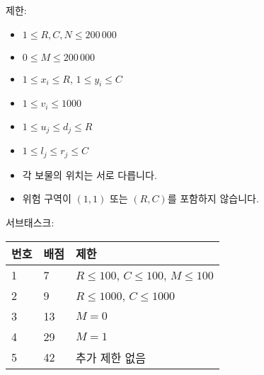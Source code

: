 제한:

\begin{itemize}
\item $1 \le R,C,N \le 200\,000$
\item $0 \le M \le 200\,000$
\item $1 \le x_i \le R$, $1 \le y_i \le C$
\item $1 \le v_i \le 1000$
\item $1 \le u_j \le d_j \le R$
\item $1 \le l_j \le r_j \le C$
\item 각 보물의 위치는 서로 다릅니다.
\item 위험 구역이 $(1, 1)$ 또는 $(R, C)$를 포함하지 않습니다.
\end{itemize}

서브태스크:

\begin{tabular}{|l|l|l|} \hline
  \textbf{번호} & \textbf{배점} & \textbf{제한} \\ \hline
  1 & 7 & $R \le 100$, $C \le 100$, $M \le 100$ \\ \hline
  2 & 9 & $R \le 1000$, $C \le 1000$ \\ \hline
  3 & 13 & $M=0$ \\ \hline
  4 & 29 & $M=1$ \\ \hline
  5 & 42 & 추가 제한 없음 \\ \hline
\end{tabular}